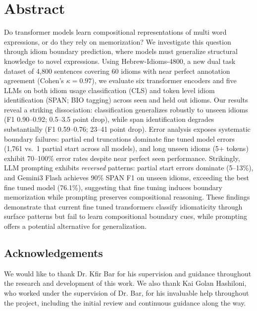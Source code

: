 \documentclass[11pt, a4paper]{report}
\providecommand{\phantomsection}{}
\begin{document}
\chapter*{Abstract}
\phantomsection                          %
Do transformer models learn compositional representations of multi word expressions, or do they rely on memorization? We investigate this question through idiom boundary prediction, where models must generalize structural knowledge to novel expressions. Using Hebrew-Idioms-4800, a new dual task dataset of 4,800 sentences covering 60 idioms with near perfect annotation agreement (Cohen's $\kappa = 0.97$), we evaluate six transformer encoders and five LLMs on both idiom usage classification (CLS) and token level idiom identification (SPAN; BIO tagging) across seen and held out idioms. Our results reveal a striking dissociation: classification generalizes robustly to unseen idioms (F1 0.90--0.92; 0.5--3.5 point drop), while span identification degrades substantially (F1 0.59--0.76; 23--41 point drop). Error analysis exposes systematic boundary failures: partial end truncations dominate fine tuned model errors (1,761 vs.\ 1 partial start across all models), and long unseen idioms (5+ tokens) exhibit 70--100\% error rates despite near perfect seen performance. Strikingly, LLM prompting exhibits \textit{reversed} patterns: partial start errors dominate (5--13\%), and Gemini3 Flash achieves 90\% SPAN F1 on unseen idioms, exceeding the best fine tuned model (76.1\%), suggesting that fine tuning induces boundary memorization while prompting preserves compositional reasoning. These findings demonstrate that current fine tuned transformers classify idiomaticity through surface patterns but fail to learn compositional boundary cues, while prompting offers a potential alternative for generalization.

\vspace{1cm}

\section*{Acknowledgements}
We would like to thank Dr. Kfir Bar for his supervision and guidance throughout the research and development of this work. We also thank Kai Golan Hashiloni, who worked under the supervision of Dr. Bar, for his invaluable help throughout the project, including the initial review and continuous guidance along the way.


\setcounter{tocdepth}{2}   %
\tableofcontents
\newpage
\end{document}
